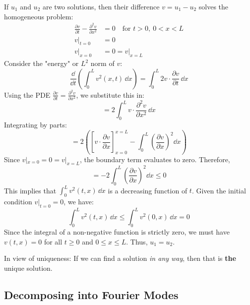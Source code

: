 \begin{proofbox}
If $u_1$ and $u_2$ are two solutions, then their difference $v = u_1 - u_2$ solves the homogeneous problem:
\begin{align*}
    \frac{\partial v}{\partial t} - \frac{\partial^2 v}{\partial x^2} &= 0 \quad \text{for } t > 0, \ 0 < x < L \\
    v|_{t=0} &= 0 \\
    v|_{x=0} &= 0 = v|_{x=L}
\end{align*}
Consider the "energy" or $L^2$ norm of $v$:
\begin{equation*}
    \frac{\dd}{\dd t} \left( \int_0^L v^2(x,t) \, \dd x \right) = \int_0^L 2v \cdot \frac{\partial v}{\partial t} \, \dd x
\end{equation*}
Using the PDE $\frac{\partial v}{\partial t} = \frac{\partial^2 v}{\partial x^2}$, we substitute this in:
\begin{equation*}
    = 2 \int_0^L v \cdot \frac{\partial^2 v}{\partial x^2} \, \dd x
\end{equation*}
Integrating by parts:
\begin{equation*}
    = 2 \left( \left[ v \cdot \frac{\partial v}{\partial x} \right]_{x=0}^{x=L} - \int_0^L \left(\frac{\partial v}{\partial x}\right)^2 \dd x \right)
\end{equation*}
Since $v|_{x=0} = 0 = v|_{x=L}$, the boundary term evaluates to zero. Therefore,
\begin{equation*}
    = -2 \int_0^L \left(\frac{\partial v}{\partial x}\right)^2 \dd x \le 0
\end{equation*}
This implies that $\int_0^L v^2(t,x) \, \dd x$ is a decreasing function of $t$. Given the initial condition $v|_{t=0} = 0$, we have:
\begin{equation*}
    \int_0^L v^2(t,x) \, \dd x \le \int_0^L v^2(0,x) \, \dd x = 0
\end{equation*}
Since the integral of a non-negative function is strictly zero, we must have $v(t,x) = 0$ for all $t \ge 0$ and $0 \le x \le L$. Thus, $u_1 = u_2$.
\end{proofbox}

\begin{remark}
In view of uniqueness: If we can find a solution \textit{in any way}, then that is \textbf{the} unique solution.
\end{remark}

\subsection{Decomposing into Fourier Modes}

